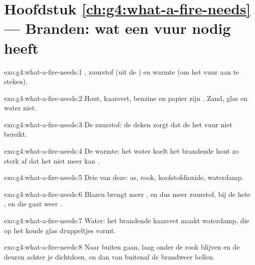 \section*{Hoofdstuk \ref{ch:g4:what-a-fire-needs} --- Branden: wat een vuur nodig heeft}

\begin{solution}{exo:g4:what-a-fire-needs:1}
, zuurstof (uit de ) en warmte (om het vuur aan te
steken).
\end{solution}

\begin{solution}{exo:g4:what-a-fire-needs:2}
Hout, kaarsvet, benzine en papier zijn . Zand, glas en water
 niet.
\end{solution}

\begin{solution}{exo:g4:what-a-fire-needs:3}
De zuurstof: de deken zorgt dat de  het vuur niet bereikt.
\end{solution}

\begin{solution}{exo:g4:what-a-fire-needs:4}
De warmte: het water koelt het brandende hout zo sterk af dat het niet
meer kan .
\end{solution}

\begin{solution}{exo:g4:what-a-fire-needs:5}
Drie van deze: as, rook, koolstofdioxide, waterdamp.
\end{solution}

\begin{solution}{exo:g4:what-a-fire-needs:6}
Blazen brengt meer , en dus meer zuurstof, bij de hete , en
die gaat weer .
\end{solution}

\begin{solution}{exo:g4:what-a-fire-needs:7}
Water: het brandende kaarsvet maakt waterdamp, die op het koude glas
druppeltjes vormt.
\end{solution}

\begin{solution}{exo:g4:what-a-fire-needs:8}
Naar buiten gaan, laag onder de rook blijven en de deuren achter je
dichtdoen, en dan van buitenaf de brandweer bellen.
\end{solution}

